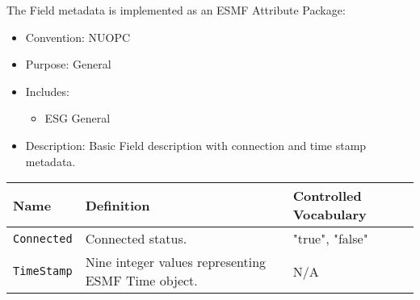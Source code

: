 The Field metadata is implemented as an ESMF Attribute Package:

\begin{itemize}
    \item Convention: NUOPC
    \item Purpose: General
    \item Includes:
    \begin{itemize}
        \item ESG General
    \end{itemize} 
    \item Description: Basic Field description with connection and time stamp metadata. 
\end{itemize}

\begin{tabular}{|p{5cm}|p{5cm}|p{35mm}|}
     \hline\hline
     {\bf Name} & {\bf Definition} & {\bf Controlled Vocabulary}\\
     \hline\hline
     {\tt Connected} & Connected status.& "true", "false"\\
     {\tt TimeStamp} & Nine integer values representing ESMF Time object.& N/A\\
     \hline\hline
\end{tabular}
